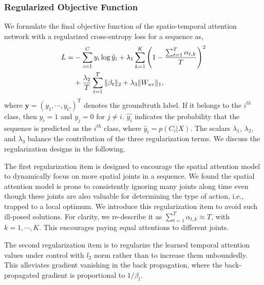 \documentclass[letterpaper]{article}
\begin{document}
\subsubsection{Regularized Objective Function}

We formulate the final objective function of the spatio-temporal attention network with a regularized cross-entropy loss for a sequence as,
\begin{equation}
\label{equ:lossfuntion}
\vspace{-2mm}
\begin{split}
L = &-\sum_{i=1}^C y_i\log \hat{y}_i + \lambda_1 \sum_{k=1}^K \left( 1 - \frac{\sum_{t=1}^T \alpha_{t,k}}{T} \right)^2 \\
\vspace{-2mm}
&+  \frac{ \lambda_2}{T}\sum_{t=1}^T \|\beta_t\|_2
 + \lambda_3 \| \mathsfsl{W}_{u v}\|_1,
\end{split}
\vspace{-0mm}
\end{equation}
where $\mathbf{y} = (y_1, \cdots, y_C)^\mathrm{T}$  denotes the groundtruth label. If it belongs to the $i^{th}$ class, then $y_i\!=\!1$ and $y_{j}\!=\!0$ for $j\!\neq\!i$. $\hat{y_i}$ indicates the probability that the sequence is predicted as the $i^{th}$ class, where $\hat{y}_{i}\!=\!p (C_i|X)$. The scalars $\lambda_1$, $\lambda_2$, and $\lambda_3$ balance the contribution of the three regularization terms. We discuss the regularization designs in the following.  

The first regularization item is designed to encourage the spatial attention model to dynamically focus on more spatial joints  in a sequence. We found the spatial attention model is prone to consistently ignoring many joints along time even though these joints are also valuable for determining the type of action, i.e., trapped to a local optimum. We introduce this regularization item to avoid such ill-posed solutions. For clarity, we re-describe it as $\sum_{t=1}^T \alpha_{t,k} \!\approx\!T$, with $k = 1,\cdots, K$. This encourages paying equal attentions to different joints.
\begin{comment}
\begin{equation}
\label{equ:spa_constraint}
\sum_{t=1}^T \alpha_{t,k} \approx T.
\end{equation}
\end{comment}

The second regularization item is to regularize the learned temporal attention values under control with $l_2$ norm rather than to increase them unboundedly. This alleviates  gradient vanishing in the back propagation, where the back-propagated gradient is proportional to $1/\beta_{t}$.
\end{document}
